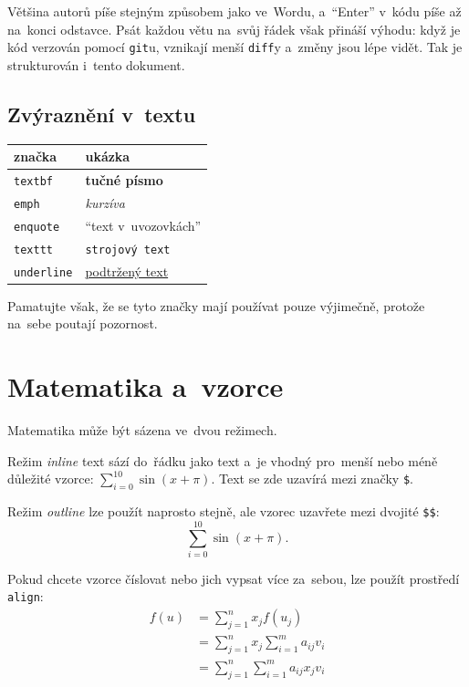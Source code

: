 Většina autorů píše stejným způsobem jako ve~Wordu, a~\enquote{Enter} v~kódu píše až na~konci odstavce.
Psát každou větu na~svůj řádek však přináší výhodu: když je kód verzován pomocí \texttt{git}u, vznikají menší \texttt{diff}y a~změny jsou lépe vidět.
Tak je strukturován i~tento dokument.
 
\subsection{Zvýraznění v~textu}

\begin{table}[ht]
\centering
\begin{tabular}{|l|l|}
značka & ukázka \\
\hline \hline
\texttt{textbf} & \textbf{tučné písmo} \\
\texttt{emph} & \emph{kurzíva} \\
\texttt{enquote} & \enquote{text v~uvozovkách} \\
\texttt{texttt} & \texttt{strojový text} \\
\texttt{underline} & \underline{podtržený text} \\
\end{tabular}
\end{table}
\FloatBarrier

Pamatujte však, že se tyto značky mají používat pouze výjimečně, protože na~sebe poutají pozornost.


\clearpage
\section{Matematika a~vzorce}

Matematika může být sázena ve~dvou režimech.

Režim \emph{inline} text sází do~řádku jako text a~je vhodný pro~menší nebo méně důležité vzorce:
$\sum_{i=0}^{10} \sin (x + \pi)$.
Text se zde uzavírá mezi značky \verb|$|.

Režim \emph{outline} lze použít naprosto stejně, ale vzorec uzavřete mezi dvojité \verb|$$|:
$$\sum_{i=0}^{10} \sin (x + \pi).$$

Pokud chcete vzorce číslovat nebo jich vypsat více za~sebou, lze použít prostředí \texttt{align}:
\begin{align*}
f(u) & =\sum_{j=1}^{n} x_jf(u_j) \\
     & =\sum_{j=1}^{n} x_j \sum_{i=1}^{m} a_{ij}v_i \\
     & =\sum_{j=1}^{n} \sum_{i=1}^{m} a_{ij}x_jv_i
\end{align*}

